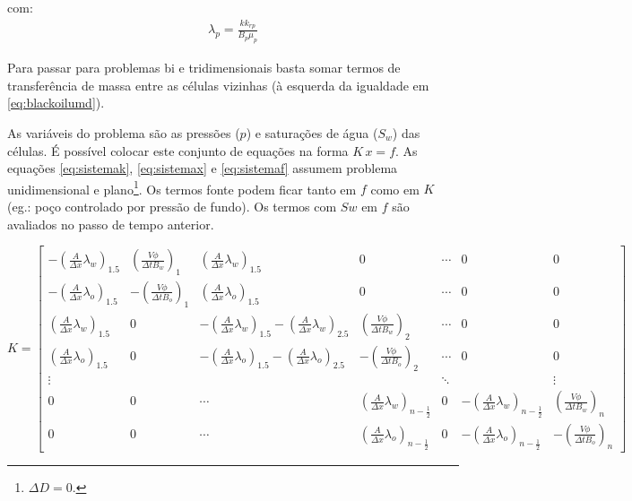 \documentclass[final,5p]{elsarticle}
\numberwithin{equation}{section}
\begin{document}
        \noindent com:
        \begin{align}
            \lambda_p = \frac{k k_{rp}}{B_p \mu_p} \nonumber
        \end{align}

        Para passar para problemas bi e tridimensionais basta somar termos de transferência de massa entre as células vizinhas (à esquerda da igualdade em \ref{eq:blackoilumd}).

        As variáveis do problema são as pressões ($p$) e saturações de água ($S_w$) das células. É possível colocar este conjunto de equações na forma $K\,x=f$. As equações \ref{eq:sistemak}, \ref{eq:sistemax} e \ref{eq:sistemaf} assumem problema unidimensional e plano\footnote{$\Delta D = 0$.}. Os termos fonte podem ficar tanto em $f$ como em $K$ (eg.: poço controlado por pressão de fundo). Os termos com $Sw$ em $f$ são avaliados no passo de tempo anterior.

        \begin{figure*}
        \begin{equation}
            K =
            \begin{bmatrix}
                    -\left( \frac{A}{\Delta x} \lambda_w \right)_{1.5} &  \left(\frac{V \phi}{\Delta t B_w}\right)_1 & \left( \frac{A}{\Delta x} \lambda_w \right)_{1.5} & 0 & \cdots & 0 & 0 \\
                    -\left( \frac{A}{\Delta x} \lambda_o \right)_{1.5} & -\left(\frac{V \phi}{\Delta t B_o}\right)_1 & \left( \frac{A}{\Delta x} \lambda_o \right)_{1.5} & 0 & \cdots & 0 & 0 \\

                    \left( \frac{A}{\Delta x} \lambda_w \right)_{1.5} & 0 & -\left( \frac{A}{\Delta x} \lambda_w \right)_{1.5}-\left( \frac{A}{\Delta x} \lambda_w \right)_{2.5} &  \left(\frac{V \phi}{\Delta t B_w}\right)_2 & \cdots & 0 & 0 \\
                    \left( \frac{A}{\Delta x} \lambda_o \right)_{1.5} & 0 & -\left( \frac{A}{\Delta x} \lambda_o \right)_{1.5}-\left( \frac{A}{\Delta x} \lambda_o \right)_{2.5} & -\left(\frac{V \phi}{\Delta t B_o}\right)_2 & \cdots & 0  & 0 \\

                    \vdots     &     &      &  & \ddots &  & \vdots \\
                    0 & 0 & \cdots & \left( \frac{A}{\Delta x} \lambda_w \right)_{n-\frac{1}{2}} &  0 & -\left( \frac{A}{\Delta x} \lambda_w \right)_{n-\frac{1}{2}} &  \left(\frac{V \phi}{\Delta t B_w}\right)_n \\
                    0 & 0 & \cdots & \left( \frac{A}{\Delta x} \lambda_o \right)_{n-\frac{1}{2}} &  0 & -\left( \frac{A}{\Delta x} \lambda_o \right)_{n-\frac{1}{2}} & -\left(\frac{V \phi}{\Delta t B_o}\right)_n
            \end{bmatrix}
            \label{eq:sistemak}
        \end{equation}
        \end{figure*}
\end{document}
